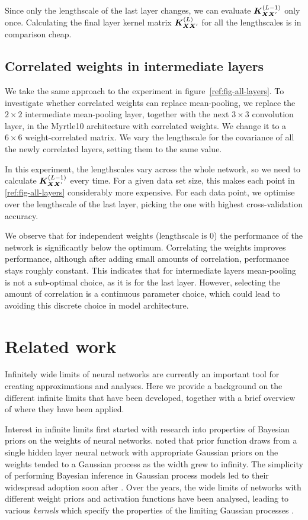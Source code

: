 \documentclass[accepted]{uai2021} %
\newcommand{\0}{\boldsymbol{0}}
\newcommand{\1}{\boldsymbol{1}}
\begin{document}
Since only the lengthscale of the last layer changes, we can evaluate ${\bm{K}}^{{\left( L-1 \right)}}_{{\bm{X}}{\bm{X}}'}$ only once. Calculating the final layer kernel matrix ${\bm{K}}^{{\left( L \right)}}_{{\bm{X}}{\bm{X}}'}$ for all the lengthscales is in comparison cheap.

\subsection{Correlated weights in intermediate layers}
We take the same approach to the experiment in figure~\ref{ref:fig-all-layers}. To investigate whether correlated weights can replace mean-pooling, we replace the $2\times 2$ intermediate mean-pooling layer, together with the next $3\times 3$ convolution layer, in the Myrtle10 architecture with correlated weights. We change it to a $6 \times 6$ weight-correlated matrix. We vary the lengthscale for the covariance of all the newly correlated layers, setting them to the same value.

In this experiment, the lengthscales vary across the whole network, so we need to calculate ${\bm{K}}^{{\left( L-1 \right)}}_{{\bm{X}}{\bm{X}}'}$ every time. For a given data set size, this makes each point in \cref{ref:fig-all-layers} considerably more expensive. For each data point, we optimise over the lengthscale of the last layer, picking the one with highest cross-validation accuracy.


We observe that for independent weights (lengthscale is 0) the performance of the network is significantly below the optimum. Correlating the weights improves performance, although after adding small amounts of correlation, performance stays roughly constant. This indicates that for intermediate layers mean-pooling is not a sub-optimal choice, as it is for the last layer. However, selecting the amount of correlation is a continuous parameter choice, which could lead to avoiding this discrete choice in model architecture.

\section{Related work}
Infinitely wide limits of neural networks are currently an important tool for creating approximations and analyses. Here we provide a background on the different infinite limits that have been developed, together with a brief overview of where they have been applied.

Interest in infinite limits first started with research into properties of Bayesian priors on the weights of neural networks. \citet{neal1996bayesian} noted that prior function draws from a single hidden layer neural network with appropriate Gaussian priors on the weights tended to a Gaussian process as the width grew to infinity. The simplicity of performing Bayesian inference in Gaussian process models led to their widespread adoption soon after \citep{williams1996gpr,gpml}. Over the years, the wide limits of networks with different weight priors and activation functions have been analysed, leading to various \emph{kernels} which specify the properties of the limiting Gaussian processes \citep{williams1997inf,cho2009mkm}.
\end{document}
